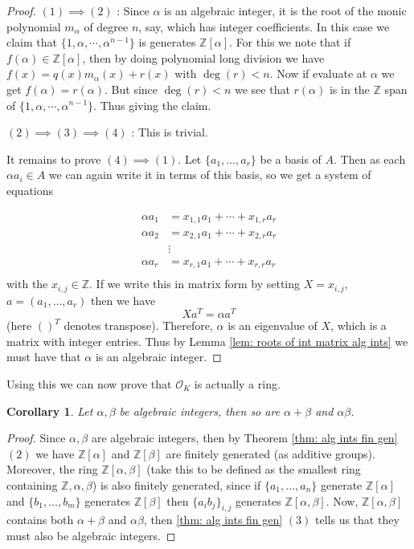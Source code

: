 \documentclass[11pt,a4paper]{report}
\theoremstyle{plain}
\newtheorem{cor}[subsection]{Corollary}
\theoremstyle{definition}
\theoremstyle{definition}
\newcommand{\ZZ}{\mathbb{Z}}
\def \a{\alpha}
\def \OO {\mathcal{O}}
\begin{document}
	\begin{proof}
		$(1) \implies (2)$ : Since $\a$ is an algebraic integer, it is the root of the monic polynomial $m_\a$ of degree $n$, say, which has integer coefficients. In this case we claim that $\{1,\a,\cdots,\a^{n-1}\}$ is generates $\ZZ[\a]$. For this we note that if $f(\a) \in \ZZ[\a]$, then by doing polynomial long division we have $f(x)=q(x)m_\a(x)+r(x)$ with $\deg(r)<n$. Now if evaluate at $\a$ we get $f(\a)=r(\a)$. But since $\deg(r)<n$ we see that $r(\a)$ is in the $\ZZ$ span of  $\{1,\a,\cdots,\a^{n-1}\}$. Thus giving the claim.
		
		$(2)\implies (3) \implies (4)$ : This is trivial.
		
		It remains to prove $(4) \implies (1)$. Let $\{a_1,\dots,a_r\}$ be a basis of $A$. Then as each $\a a_i \in A$ we can again write it in terms of this basis, so we get a system of equations 
		
		\begin{align*}
			\a a_1 &=x_{1,1} a_1+\cdots+x_{1,r}a_r  \\
			\a a_2 &=x_{2,1} a_1+\cdots+x_{2,r}a_r  \\
			&\vdots \\
			\a a_r &=x_{r,1} a_1+\cdots+x_{r,r}a_r  \\
		\end{align*}
		with the $x_{i,j} \in \ZZ$. If we write this in matrix form by setting $X={x_{i,j}}$, $a=(a_1,\dots,a_r)$ then we have \[X a^{T}=\a a^{T}\] (here $()^T$ denotes transpose). Therefore, $\a$ is an eigenvalue of $X$, which is a matrix with integer entries. Thus by Lemma \ref{lem: roots of int matrix alg ints} we must have that $\a$ is an algebraic integer.
		
	\end{proof}
	
	
	
	Using this we can now prove that $\OO_K$ is actually a ring.
	
	\begin{cor}\label{cor: sum and mult of alg ints is alg ints}
		Let $\a,\beta$ be algebraic integers, then so are $\a+\beta$ and $\a \beta$.
	\end{cor}
	
	\begin{proof}
		Since $\a,\beta$ are algebraic integers, then by Theorem \ref{thm: alg ints fin gen} $(2)$ we have $\ZZ[\a]$ and $\ZZ[\beta]$ are finitely generated (as additive groups). Moreover, the ring $\ZZ[\a,\beta]$ (take this to be defined as the smallest ring containing $\ZZ,\a,\beta$) is also finitely generated, since if $\{a_1,\dots,a_n\}$ generate $\ZZ[\a]$ and $\{b_1,\dots,b_m\}$ generates $\ZZ[\beta]$ then $\{a_ib_j\}_{i,j}$ generates $\ZZ[\a,\beta]$. Now, $\ZZ[\a,\beta]$ contains both $\a+\beta$ and $\a\beta$, then \ref{thm: alg ints fin gen} $(3)$ tells us that they must also be algebraic integers.
	\end{proof}
	
\end{document}
